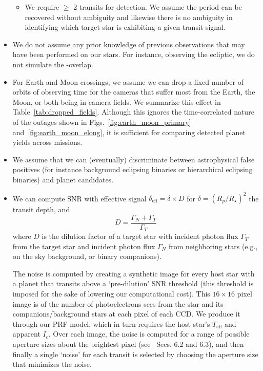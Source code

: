 \begin{itemize}
\begin{itemize}
	\item We require $\geq$ 2 transits for detection.  We assume
          the period can be recovered without ambiguity and likewise
          there is no ambiguity in identifying which target star is
          exhibiting a given transit signal.
          
	\end{itemize}

	\item We do not assume any prior knowledge of previous
          observations that may have been performed on our stars.  For
          instance, observing the ecliptic, we do not simulate the
          \tess-\ktwo overlap.
          
	\item For Earth and Moon crossings, we assume we can drop a
          fixed number of orbits of observing time for the cameras
          that suffer most from the Earth, the Moon, or both being in
          \tesss camera fields. We summarize this effect in
          Table~\ref{tab:dropped_fields}. Although this ignores the
          time-correlated nature of the outages shown in
          Figs.~\ref{fig:earth_moon_primary}
          and~\ref{fig:earth_moon_elong}, it is sufficient for
          comparing detected planet yields across missions.
          
	\item We assume that we can (eventually) discriminate between
          astrophysical false positives (for instance background
          eclipsing binaries or hierarchical eclipsing binaries) and
          planet candidates.
          
	\item We can compute SNR with effective signal
          $\delta_\text{eff} = \delta \times D$ for
          $\delta=(R_p/R_\star)^2$ the transit depth, and
	  \begin{equation}
	D = \frac{\Gamma_N + \Gamma_T}{\Gamma_T}
	\label{eq:dilution}
	\end{equation}
	where $D$ is the dilution factor of a target star with
        incident photon flux $\Gamma_T$ from the target star and
        incident photon flux $\Gamma_N$ from neighboring stars (e.g.,
        on the sky background, or binary companions).
	
	The noise is computed by creating a synthetic image for every
        host star with a planet that transits above a `pre-dilution'
        SNR threshold (this threshold is imposed for the sake of
        lowering our computational cost).  This $16\times16$ pixel
        image is of the number of photoelectrons \tess sees from the
        star and its companions/background stars at each pixel of each
        CCD.  We produce it through our PRF model, which in turn
        requires the host star's $T_\mathrm{eff}$ and apparent $I_c$.
        Over each image, the noise is computed for a range of possible
        aperture sizes about the brightest pixel
        (see~ Secs. 6.2 and 6.3), and then
        finally a single `noise' for each transit is selected by
        choosing the aperture size that minimizes the noise.

\end{itemize}
